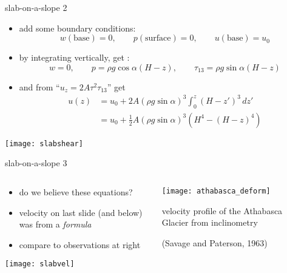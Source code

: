 \begin{frame}{slab-on-a-slope 2}

\begin{itemize}
\item add some boundary conditions:
	$$w(\text{base})=0, \qquad p(\text{surface})=0, \qquad u(\text{base})=u_0$$
\item by integrating vertically, get :
  $$w=0, \qquad p = \rho g \cos\alpha (H-z), \qquad \tau_{13} = \rho g \sin\alpha (H-z)$$
\item and from ``$u_z = 2 A \tau^2 \tau_{13}$'' get
\vspace{-0.05in}
\begin{align*}
u(z) &= u_0 + 2 A (\rho g \sin\alpha)^3 \int_0^z (H-z')^3\,dz' \\
     &= u_0 + \frac{1}{2} A (\rho g \sin\alpha)^3  \left(H^4 - (H-z)^4\right)
\end{align*}
\end{itemize}

\begin{center}
\texttt{[image: slabshear]}
\end{center}
\end{frame}


\begin{frame}{slab-on-a-slope 3}

\begin{columns}
\begin{column}{0.6\textwidth}
\begin{itemize}
\item do we believe these equations?
\item velocity on last slide (and below) was from a \emph{formula}
\item compare to observations at right
\end{itemize}
\begin{center}
\texttt{[image: slabvel]}
\end{center}
\end{column}

\begin{column}{0.4\textwidth}
\texttt{[image: athabasca\_deform]}

\medskip
\scriptsize
velocity profile of the Athabasca Glacier from inclinometry

\tiny (Savage and Paterson, 1963)
\end{column}
\end{columns}
\end{frame}


